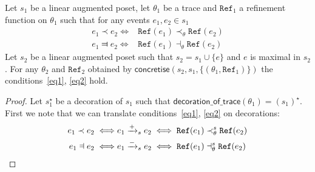 \begin{theorem}
  Let $s_1$ be a linear augmented poset, let $\theta_1$ be a trace and $\mathtt{Ref}_1$ a refinement function on $\theta_1$ such that for any events $e_1,e_2\in s_1$
  \begin{align}
    \label{eq1}
    e_1\prec e_2 \iff& \mathtt{Ref}(e_1) \prec_{\theta}\mathtt{Ref}(e_2)\\
    \label{eq2}
    e_1\Dashv e_2 \iff& \mathtt{Ref}(e_1) \dashv_{\theta}\mathtt{Ref}(e_2)
  \end{align}
  Let $s_2$ be a linear augmented poset such that $s_2=s_1\cup\{e\}$ and $e$ is maximal in $s_2$.
  For any $\theta_2$ and $\mathtt{Ref}_2$ obtained by $\mathsf{concretise}(s_2,s_1,\{(\theta_1,\mathtt{Ref}_1)\})$ the conditions~\autoref{eq1}, \autoref{eq2} hold.
\end{theorem}
\begin{proof}
  Let $s_1^{\star}$ be a decoration of $s_1$ such that $\mathsf{decoration\_of\_trace}(\theta_1)=(s_1)^{\star}$.
  First we note that we can translate conditions~\autoref{eq1}, \autoref{eq2} on decorations:
  \begin{align*}
    e_1\prec e_2 \iff&e_1\redl{+}_s e_2 \iff \mathtt{Ref}(e_1) \prec_{\theta}^{s}\mathtt{Ref}(e_2)\\
    e_1\Dashv e_2 \iff&e_1\redl{-}_s e_2 \iff \mathtt{Ref}(e_1) \dashv_{\theta}^{s}\mathtt{Ref}(e_2)
  \end{align*}
\end{proof}
